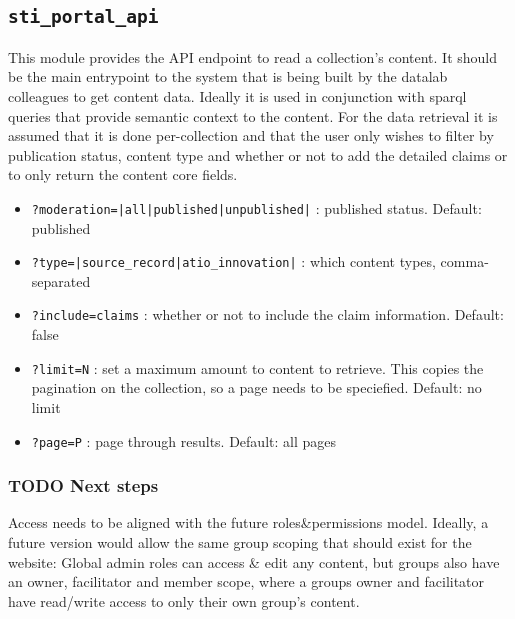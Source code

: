 \documentclass{scrartcl}
\begin{document}
\subsection{\texttt{sti\_portal\_api}}
\label{sec:org3aa63f9}
This module provides the API endpoint to read a collection's content. It should be the main entrypoint to the system that is being built by the datalab colleagues to get content data. Ideally it is used in conjunction with sparql queries that provide semantic context to the content.
For the data retrieval it is assumed that it is done per-collection and that the user only wishes to filter by publication status, content type and whether or not to add the detailed claims or to only return the content core fields.
\begin{itemize}
\item \texttt{?moderation=|all|published|unpublished|} : published status. Default: published
\item \texttt{?type=|source\_record|atio\_innovation|} : which content types, comma-separated
\item \texttt{?include=claims} : whether or not to include the claim information. Default: false
\item \texttt{?limit=N} : set a maximum amount to content to retrieve. This copies the pagination on the collection, so a page needs to be speciefied. Default: no limit
\item \texttt{?page=P} : page through results. Default: all pages
\end{itemize}
\subsubsection{{\bfseries\sffamily TODO} Next steps}
\label{sec:org0f73d6b}
Access needs to be aligned with the future roles\&permissions model. Ideally, a future version would allow the same group scoping that should exist for the website: Global admin roles can access \& edit any content, but groups also have an owner, facilitator and member scope, where a groups owner and facilitator have read/write access to only their own group's content.
\end{document}
